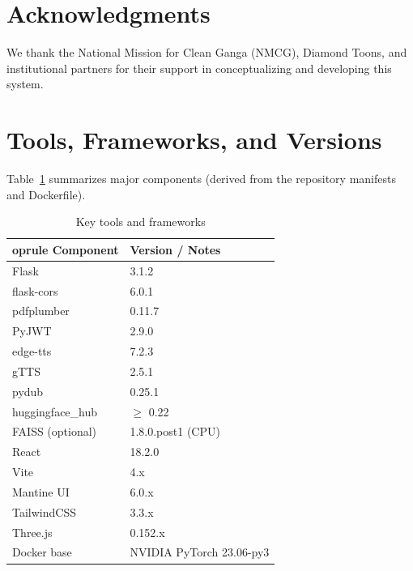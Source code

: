 \documentclass[conference]{IEEEtran}
\begin{document}
\section*{Acknowledgments}
We thank the National Mission for Clean Ganga (NMCG), Diamond Toons, and institutional partners for their support in conceptualizing and developing this system.

\section*{Tools, Frameworks, and Versions}
Table~\ref{tab:tools} summarizes major components (derived from the repository manifests and Dockerfile).

\begin{table}[h]
  \centering
  \caption{Key tools and frameworks}
  \label{tab:tools}
  \begin{tabular}{ll}
    	oprule
  Component & Version / Notes \\
    \midrule
  Flask & 3.1.2 \\
  flask-cors & 6.0.1 \\
  pdfplumber & 0.11.7 \\
  PyJWT & 2.9.0 \\
  edge-tts & 7.2.3 \\
  gTTS & 2.5.1 \\
  pydub & 0.25.1 \\
  huggingface\_hub & $\ge$ 0.22 \\
  FAISS (optional) & 1.8.0.post1 (CPU) \\
  React & 18.2.0 \\
  Vite & 4.x \\
  Mantine UI & 6.0.x \\
  TailwindCSS & 3.3.x \\
  Three.js & 0.152.x \\
  Docker base & NVIDIA PyTorch 23.06-py3 \\
    \bottomrule
  \end{tabular}
\end{table}



\end{document}

